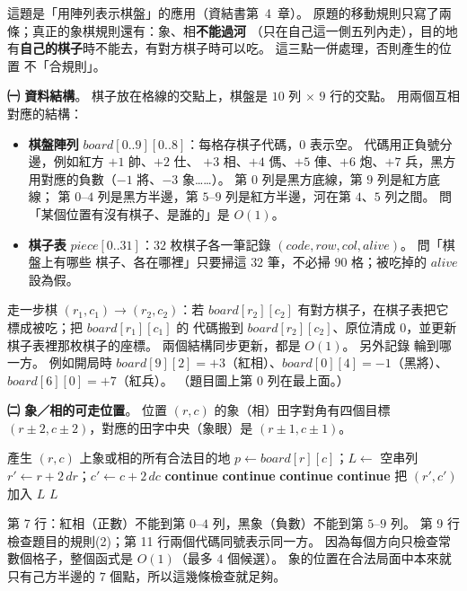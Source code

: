 \begin{pastsoln}
這題是「用陣列表示棋盤」的應用（資結書第~4~章）。 原題的移動規則只寫了兩條；真正的象棋規則還有：象、相\textbf{不能過河}
（只在自己這一側五列內走），目的地有\textbf{自己的棋子}時不能去，有對方棋子時可以吃。 這三點一併處理，否則產生的位置
不「合規則」。

\textbf{㈠ 資料結構}。 棋子放在格線的交點上，棋盤是 $10$ 列 $\times$ $9$ 行的交點。 用兩個互相對應的結構：
\begin{itemize}
\item \textbf{棋盤陣列} $\mathit{board}[0..9][0..8]$：每格存棋子代碼，$0$ 表示空。 代碼用正負號分邊，例如紅方 $+1$ 帥、$+2$ 仕、
$+3$ 相、$+4$ 傌、$+5$ 俥、$+6$ 炮、$+7$ 兵，黑方用對應的負數（$-1$ 將、$-3$ 象……）。 第 $0$ 列是黑方底線，第 $9$ 列是紅方底線；
第 $0$–$4$ 列是黑方半邊，第 $5$–$9$ 列是紅方半邊，河在第 $4$、$5$ 列之間。 問「某個位置有沒有棋子、是誰的」是 $O(1)$。
\item \textbf{棋子表} $\mathit{piece}[0..31]$：$32$ 枚棋子各一筆記錄 $(\mathit{code}, \mathit{row}, \mathit{col}, \mathit{alive})$。 問「棋盤上有哪些
棋子、各在哪裡」只要掃這 $32$ 筆，不必掃 $90$ 格；被吃掉的 $\mathit{alive}$ 設為假。
\end{itemize}
走一步棋 $(r_1, c_1) \to (r_2, c_2)$：若 $\mathit{board}[r_2][c_2]$ 有對方棋子，在棋子表把它標成被吃；把 $\mathit{board}[r_1][c_1]$ 的
代碼搬到 $\mathit{board}[r_2][c_2]$、原位清成 $0$，並更新棋子表裡那枚棋子的座標。 兩個結構同步更新，都是 $O(1)$。 另外記錄
輪到哪一方。 例如開局時 $\mathit{board}[9][2] = +3$（紅相）、$\mathit{board}[0][4] = -1$（黑將）、$\mathit{board}[6][0] = +7$（紅兵）。
（題目圖上第 $0$ 列在最上面。）

\textbf{㈡ 象／相的可走位置}。 位置 $(r, c)$ 的象（相）田字對角有四個目標 $(r \pm 2, c \pm 2)$，對應的田字中央（象眼）是
$(r \pm 1, c \pm 1)$。
\begin{pseudo}[unbreakable]{產生 $(r, c)$ 上象或相的所有合法目的地}
    \State $p \gets \mathit{board}[r][c]$；$L \gets$ 空串列
        \State $r' \gets r + 2\,\mathit{dr}$；$c' \gets c + 2\,\mathit{dc}$ 
            \State \textbf{continue} 
        \EndIf
            \State \textbf{continue} 
        \EndIf
            \State \textbf{continue} 
        \EndIf
            \State \textbf{continue} 
        \EndIf
        \State 把 $(r', c')$ 加入 $L$ 
    \EndFor
    \State \Return $L$
\EndFunction
\end{pseudo}
第 7 行：紅相（正數）不能到第 $0$–$4$ 列，黑象（負數）不能到第
$5$–$9$ 列。 第 9 行檢查題目的規則(2)；第 11 行兩個代碼同號表示同一方。 因為每個方向只檢查常數個格子，整個函式是
$O(1)$（最多 $4$ 個候選）。 象的位置在合法局面中本來就只有己方半邊的 $7$ 個點，所以這幾條檢查就足夠。


\end{pastsoln}
